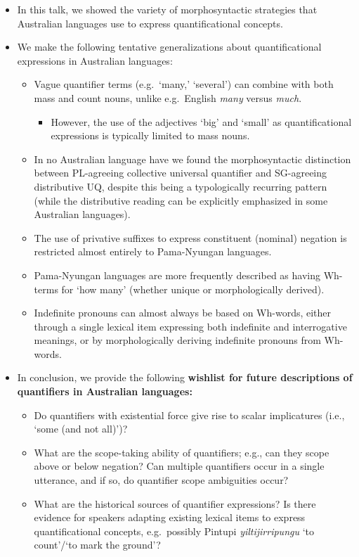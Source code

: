 \documentclass{article}
\begin{document}
\begin{itemize}
\item In this talk, we showed the variety of morphosyntactic strategies that Australian languages use to express quantificational concepts.
\item We make the following tentative generalizations about quantificational expressions in Australian languages:
\begin{itemize}
\item Vague quantifier terms (e.g.\ `many,' `several') can combine with both mass and count nouns, unlike e.g.\ English \textit{many} versus \textit{much}.
\begin{itemize}
    \item However, the use of the adjectives `big' and `small' as quantificational expressions is typically limited to mass nouns.
\end{itemize}
\item In no Australian language have we found the morphosyntactic distinction between PL-agreeing collective universal quantifier and SG-agreeing distributive UQ, despite this being a typologically recurring pattern (while the distributive reading can be explicitly emphasized in some Australian languages). %
\item The use of privative suffixes to express constituent (nominal) negation is restricted almost entirely to Pama-Nyungan languages.
\item Pama-Nyungan languages are more frequently described as having Wh-terms for `how many' (whether unique or morphologically derived).
\item Indefinite pronouns can almost always be based on Wh-words, either through a single lexical item expressing both indefinite and interrogative meanings, or by morphologically deriving indefinite pronouns from Wh-words.
\end{itemize}
    \item In conclusion, we provide the following \textbf{wishlist for future descriptions of quantifiers in Australian languages:}
    \begin{itemize}
        \item Do quantifiers with existential force give rise to scalar implicatures (i.e., `some (and not all)')?
        \item What are the scope-taking ability of quantifiers; e.g., can they scope above or below negation? Can multiple quantifiers occur in a single utterance, and if so, do quantifier scope ambiguities occur?
        \item What are the historical sources of quantifier expressions? Is there evidence for speakers adapting existing lexical items to express quantificational concepts, e.g.\ possibly Pintupi \textit{yiltijirripungu} `to count'/`to mark the ground'?
    \end{itemize}
\end{itemize}

{\small 


}
\end{document}
